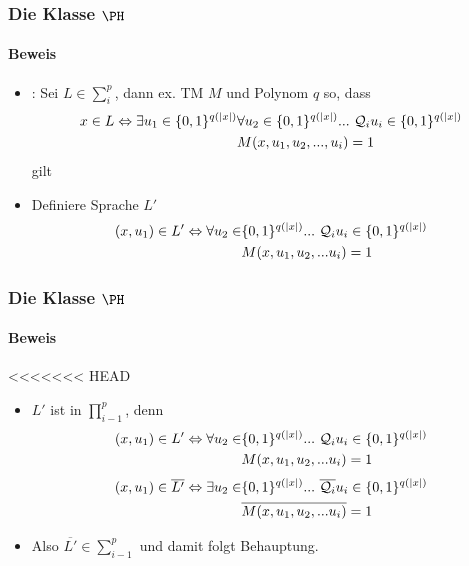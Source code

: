 	
\begin{frame}
	\frametitle{Die Klasse $\PH$}
	\framesubtitle{Beweis}
	\begin{itemize}[<+->]
		\item {}: Sei $L \in \sum_{i}^{p}$, dann ex. TM $M$ und Polynom $q$ so, dass \newline
		\begin{align}
			x \in L \Leftrightarrow  \exists u_1 \in \{0,1\}^{q(|x|)} &\forall u_2  \in \{0,1\}^{q(|x|)} ... \ \mathcal{Q}_i u_i \in \{0,1\}^{q(|x|)}  \notag \\
			&M(x,u_1,u_2,...,u_i)=1 \notag
		\end{align}
		gilt
		\bigskip
		\item Definiere Sprache $L'$
		\begin{align}
		(x,u_1) \in L' \Leftrightarrow \forall u_2 \in &\{0,1\}^{q(|x|)} ... \ \mathcal{Q}_i u_i \in \{0,1\}^{q(|x|)} \notag \\ &M(x,u_1,u_2, ... u_i) = 1 \notag 
		\end{align}
	
	\end{itemize}
\end{frame}
\begin{frame}
	\frametitle{Die Klasse $\PH$}
	\framesubtitle{Beweis}
<<<<<<< HEAD
	\begin{itemize}[<+->]
		\item $L'$ ist in $\prod_{i-1}^{p}$, denn
		\begin{align}
			(x,u_1) \in L' \Leftrightarrow \forall u_2 \in &\{0,1\}^{q(|x|)} ... \ \mathcal{Q}_i u_i \in \{0,1\}^{q(|x|)} \notag \\ &M(x,u_1,u_2, ... u_i) = 1 \notag 
		\end{align}
		\begin{align}
			(x,u_1) \in \overline{L'} \Leftrightarrow \exists u_2 \in &\{0,1\}^{q(|x|)} ... \ \overline{\mathcal{Q}_i} u_i \in \{0,1\}^{q(|x|)} \notag \\ &\overline{M(x,u_1,u_2, ... u_i)} = 1 \notag 
		\end{align}
		\item Also $\overline{L'} \in \sum_{i-1}^{p}$ und damit folgt Behauptung.
	\end{itemize}
\end{frame}
